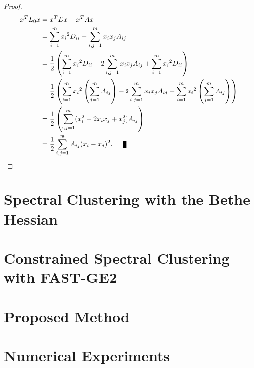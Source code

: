 \begin{proof}
   \begin{equation*} 
      \begin{split}
         x^T L_0 x &= x^TDx - x^TAx \\
         &= \sum_{i=1}^m {x_i}^2 D_{ii} - \sum_{i,j = 1}^m x_i x_j A_{ij}  \\
         &= \frac{1}{2} \left( \sum_{i=1}^m {x_i}^2 D_{ii} - 2\sum_{i,j = 1}^m x_i x_j A_{ij} +  \sum_{i=1}^m {x_i}^2 D_{ii}\right) \\
         &= \frac{1}{2} \left( \sum_{i=1}^m {x_i}^2 \left( \sum_{j=1}^m A_{ij} \right) - 2\sum_{i,j = 1}^m x_i x_j A_{ij} +  \sum_{i=1}^m {x_i}^2 \left( \sum_{j=1}^m A_{ij} \right) \right) \\
         &= \frac{1}{2} \left( \sum_{i,j=1}^m (x_i^2 - 2x_ix_j + x_j^2) A_{ij} \right) \\
         &= \frac{1}{2} \sum_{i,j=1}^m A_{ij} (x_i-x_j)^2. \qed
      \end{split}
   \end{equation*}
\end{proof}










\chapter{Spectral Clustering with the Bethe Hessian}


\chapter{Constrained Spectral Clustering with FAST-GE2}


\chapter{Proposed Method}


\chapter{Numerical Experiments}







